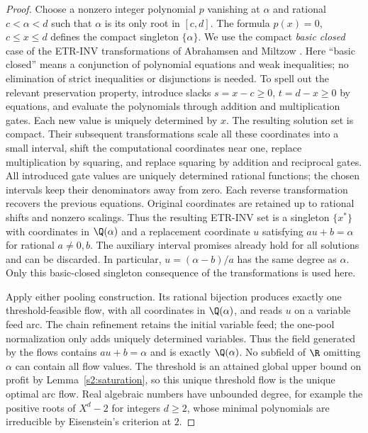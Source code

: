 \begin{proof}
Choose a nonzero integer polynomial $p$ vanishing at $\alpha$ and
rational $c<\alpha<d$ such that $\alpha$ is its only root in $[c,d]$.
The formula $p(x)=0$, $c\le x\le d$ defines the compact singleton
$\{\alpha\}$. We use the compact \emph{basic closed} case of the
ETR-INV transformations of Abrahamsen and Miltzow
\citep[Lemmas~C--G, underlying Theorem~1]{abrahamsen2019-dynamic-toolbox-for-etrinv}.
Here ``basic closed'' means a conjunction of polynomial equations and
weak inequalities; no elimination of strict inequalities or disjunctions
is needed. To spell out the relevant preservation property, introduce
slacks $s=x-c\ge0$, $t=d-x\ge0$ by equations, and evaluate the
polynomials through addition and multiplication gates. Each new value
is uniquely determined by $x$. The resulting solution set is compact.
Their subsequent transformations scale all these coordinates into a
small interval, shift the computational coordinates near one, replace
multiplication by squaring, and replace squaring by addition and
reciprocal gates. All introduced gate values are uniquely determined
rational functions; the chosen intervals keep their denominators away
from zero. Each reverse transformation recovers the previous equations.
Original coordinates are retained up to rational shifts and nonzero
scalings. Thus the resulting \textsc{ETR-INV} set is a singleton
$\{x^*\}$ with coordinates in $\Q(\alpha)$ and a replacement
coordinate $u$ satisfying $au+b=\alpha$ for rational $a\ne0,b$.
The auxiliary interval promises already hold for all solutions and can
be discarded. In particular, $u=(\alpha-b)/a$ has the same degree as
$\alpha$. Only this basic-closed singleton consequence of the
transformations is used here.

Apply either pooling construction. Its rational bijection produces
exactly one threshold-feasible flow, with all coordinates in
$\Q(\alpha)$, and reads $u$ on a variable feed arc. The chain
refinement retains the initial variable feed; the one-pool
normalization only adds uniquely determined variables. Thus the field
generated by the flows contains $au+b=\alpha$ and is exactly
$\Q(\alpha)$. No subfield of $\R$ omitting $\alpha$ can contain all
flow values. The threshold is an attained global upper bound on profit
by Lemma~\ref{s2:saturation}, so this unique threshold flow is the
unique optimal arc flow. Real algebraic numbers have unbounded degree,
for example the positive roots of $X^d-2$ for integers $d\ge2$, whose
minimal polynomials are irreducible by Eisenstein's criterion at $2$.
\end{proof}

